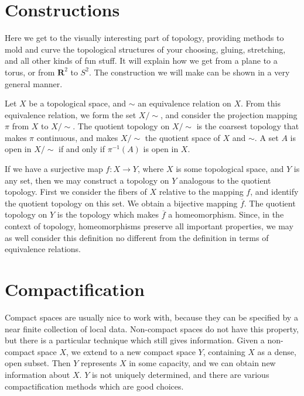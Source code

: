 \chapter{Constructions}

Here we get to the visually interesting part of topology, providing methods to mold and curve the topological structures of your choosing, gluing, stretching, and all other kinds of fun stuff. It will explain how we get from a plane to a torus, or from $\mathbf{R}^2$ to $S^2$. The construction we will make can be shown in a very general manner.

\begin{definition}
    Let $X$ be a topological space, and $\sim$ an equivalence relation on $X$. From this equivalence relation, we form the set $X/\sim$, and consider the projection mapping $\pi$ from $X$ to $X/\sim$. The quotient topology on $X/\sim$ is the coarsest topology that makes $\pi$ continuous, and makes $X/\sim$ the quotient space of $X$ and $\sim$. A set $A$ is open in $X/\sim$ if and only if $\pi^{-1}(A)$ is open in $X$.
\end{definition}

If we have a surjective map $f:X \to Y$, where $X$ is some topological space, and $Y$ is any set, then we may construct a topology on $Y$ analogous to the quotient topology. First we consider the fibers of $X$ relative to the mapping $f$, and identify the quotient topology on this set. We obtain a bijective mapping $\overline{f}$. The quotient topology on $Y$ is the topology which makes $\overline{f}$ a homeomorphism. Since, in the context of topology, homeomorphisms preserve all important properties, we may as well consider this definition no different from the definition in terms of equivalence relations.

\chapter{Compactification}

Compact spaces are usually nice to work with, because they can be specified by a near finite collection of local data. Non-compact spaces do not have this property, but there is a particular technique which still gives information. Given a non-compact space $X$, we extend to a new compact space $Y$, containing $X$ as a dense, open subset. Then $Y$ represents $X$ in some capacity, and we can obtain new information about $X$. $Y$ is not uniquely determined, and there are various compactification methods which are good choices.

